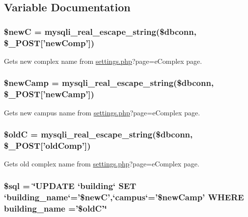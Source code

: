 \subsection{\-Variable \-Documentation}
\hypertarget{upComplex_8php_ad06b2227b1785217614a1af1253505e0}{
\subsubsection[{\$new\-C}]{\setlength{\rightskip}{0pt plus 5cm}\$new\-C = mysqli\-\_\-real\-\_\-escape\-\_\-string(\$dbconn, \$\-\_\-\-P\-O\-S\-T\mbox{[}'new\-Comp'\mbox{]})}}\label{upComplex_8php_ad06b2227b1785217614a1af1253505e0}
\-Gets new complex name from \hyperlink{settings_8php}{settings.\-php}?page=e\-Complex page. \hypertarget{upComplex_8php_a62ac845b01c144c44951edea6fe6358e}{
\subsubsection[{\$new\-Camp}]{\setlength{\rightskip}{0pt plus 5cm}\$new\-Camp = mysqli\-\_\-real\-\_\-escape\-\_\-string(\$dbconn, \$\-\_\-\-P\-O\-S\-T\mbox{[}'new\-Camp'\mbox{]})}}\label{upComplex_8php_a62ac845b01c144c44951edea6fe6358e}
\-Gets new campus name from \hyperlink{settings_8php}{settings.\-php}?page=e\-Complex page. \hypertarget{upComplex_8php_a50d27d31cd853f014465997ccb9a89f0}{
\subsubsection[{\$old\-C}]{\setlength{\rightskip}{0pt plus 5cm}\$old\-C = mysqli\-\_\-real\-\_\-escape\-\_\-string(\$dbconn, \$\-\_\-\-P\-O\-S\-T\mbox{[}'old\-Comp'\mbox{]})}}\label{upComplex_8php_a50d27d31cd853f014465997ccb9a89f0}
\-Gets old complex name from \hyperlink{settings_8php}{settings.\-php}?page=e\-Complex page. \hypertarget{upComplex_8php_a047170d6020a882807665812a27e2525}{
\subsubsection[{\$sql}]{\setlength{\rightskip}{0pt plus 5cm}\$sql = \char`\"{}\-U\-P\-D\-A\-T\-E `building` \-S\-E\-T `building\-\_\-name`='\$new\-C',`campus`='\$new\-Camp' \-W\-H\-E\-R\-E building\-\_\-name ='\$old\-C'\char`\"{}}}\label{upComplex_8php_a047170d6020a882807665812a27e2525}
